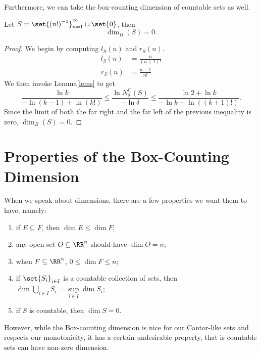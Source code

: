 Furthermore, we can take the box-counting dimension of countable sets as well.

\begin{example}
	Let $S=\set{{(n!)}^{-1}}_{n=1}^\infty\cup\set{0}$, then
	\[
		\dim_B(S)=0.
	\]
\end{example}
\begin{proof}
	We begin by computing $l_S(n)$ and $r_S(n)$.
	\begin{align*}
		l_S(n) &= \frac{n}{(n+1)!}\\
		r_S(n) &= \frac{n-1}{n!}
	\end{align*}
	We then invoke Lemma\autoref{lems} to get
	\[
		\frac{\ln k}{-\ln (k-1)+\ln(k!)} \leq \frac{\ln N^C_\delta(S)}{-\ln\delta} \leq \frac{\ln 2+\ln k}{-\ln k +\ln ((k+1)!)}.
	\]
	Since the limit of both the far right and the far left of the previous inequality is zero, $\dim_B(S)=0$.
\end{proof}

\section{Properties of the Box-Counting Dimension}

When we speak about dimensions, there are a few properties we want them to have, namely:
\begin{enumerate}
	\item if $E\subseteq F$, then $\dim E\leq\dim F$;
	\item any open set $O\subseteq \RR^n$ should have $\dim O = n$;
	\item when $F\subseteq \RR^n$, $0\leq \dim F\leq n$;
	\item if $\set{S_i}_{i\in I}$ is a countable collection of sets, then $\dim \bigcup_{i\in I} S_i = \sup\limits_{i\in I}\dim S_i$;
	\item if $S$ is countable, then $\dim S=0$.
\end{enumerate}


However, while the Box-counting dimension is nice for our Cantor-like sets and respects our monotonicity, it has a certain undesirable property, that is countable sets can have non-zero dimension.

